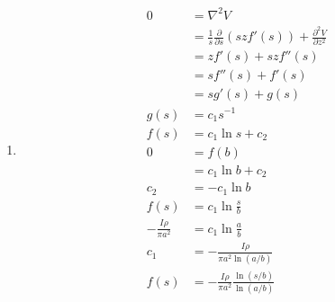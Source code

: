 \documentclass{article}
\begin{document}
\setcounter{subsection}{42}
\subsection{}

\begin{enumerate}
  \item

        \begin{align*}
          0                       & = \nabla^2 V                                                                              \\
                                  & = \frac{1}{s} \frac{\partial}{\partial s} (s z f'(s)) + \frac{\partial^2 V}{\partial z^2} \\
                                  & = z f'(s) + s z f''(s)                                                                    \\
                                  & = s f''(s) + f'(s)                                                                        \\
                                  & = s g'(s) + g(s)                                                                          \\
          g(s)                    & = c_1 s^{-1}                                                                              \\
          f(s)                    & = c_1 \ln s + c_2                                                                         \\
          0                       & = f(b)                                                                                    \\
                                  & = c_1 \ln b + c_2                                                                         \\
          c_2                     & = -c_1 \ln b                                                                              \\
          f(s)                    & = c_1 \ln \frac{s}{b}                                                                     \\
          -\frac{I \rho}{\pi a^2} & = c_1 \ln \frac{a}{b}                                                                     \\
          c_1                     & = -\frac{I \rho}{\pi a^2 \ln (a / b)}                                                     \\
          f(s)                    & = -\frac{I \rho}{\pi a^2} \frac{\ln (s / b)}{\ln (a / b)}
        \end{align*}


\end{enumerate}
\end{document}
